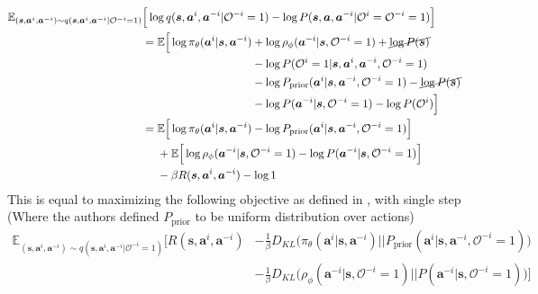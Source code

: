 \begin{equation}
    \begin{aligned}
        \mathbb{E}_{(\boldsymbol{s}, \boldsymbol{a}^i, \boldsymbol{a}^{-i}) \sim q(\boldsymbol{s}, \boldsymbol{a}^i, \boldsymbol{a}^{-i} | \mathcal{O}^{-i} = 1)} &\Big[\log q(\boldsymbol{s}, \boldsymbol{a}^i, \boldsymbol{a}^{-i} | \mathcal{O}^{-i} = 1) - \log P(\boldsymbol{s}, \boldsymbol{a}, \boldsymbol{a}^{-i} | \mathcal{O}^{i} = \mathcal{O}^{-i} = 1) \Big] \\
        &= \begin{aligned}[t]
                \mathbb{E}\Big[ \log \pi_{\theta}(\boldsymbol{a}^i | \boldsymbol{s}, \boldsymbol{a}^{-i}) &+ \log \rho_{\phi}(\boldsymbol{a}^{-i} | \boldsymbol{s}, \mathcal{O}^{-i} = 1) + \cancel{\log P(\boldsymbol{s})} \\
                &-\log P(\mathcal{O}^i = 1 | \boldsymbol{s}, \boldsymbol{a}^i, \boldsymbol{a}^{-i}, \mathcal{O}^{-i} = 1) \\
                &- \log P_{\text{prior}}(\boldsymbol{a}^i | \boldsymbol{s}, \boldsymbol{a}^{-i}, \mathcal{O}^{-i} = 1) - \cancel{\log P(\boldsymbol{s})} \\
                &- \log P(\boldsymbol{a}^{-i} |\boldsymbol{s}, \mathcal{O}^{-i} = 1) - \log P(\mathcal{O}^{i}) \Big] 
            \end{aligned} \\
        &= \begin{aligned}[t]
                &\mathbb{E}\Big[ \log \pi_{\theta}(\boldsymbol{a}^i | \boldsymbol{s}, \boldsymbol{a}^{-i}) -  \log P_{\text{prior}}(\boldsymbol{a}^i | \boldsymbol{s}, \boldsymbol{a}^{-i}, \mathcal{O}^{-i} = 1) \Big] \\ 
                &+\mathbb{E}\Big[ \log \rho_{\phi}(\boldsymbol{a}^{-i} | \boldsymbol{s}, \mathcal{O}^{-i} = 1) - \log P(\boldsymbol{a}^{-i} |\boldsymbol{s}, \mathcal{O}^{-i} = 1) \Big] \\
                &-\beta R(\boldsymbol{s}, \boldsymbol{a}^i, \boldsymbol{a}^{-i}) -\log 1
            \end{aligned}
    \end{aligned} 
\end{equation}
This is equal to maximizing the following objective as defined in \cite{tian2019regularized}, with single step (Where the authors defined $P_{\text{prior}}$ to be uniform distribution over actions)
\begin{equation}
    \begin{aligned}
        \mathbb{E}_{(\boldsymbol{s}, \boldsymbol{a}^i, \boldsymbol{a}^{-i}) \sim q(\boldsymbol{s}, \boldsymbol{a}^i, \boldsymbol{a}^{-i} | \mathcal{O}^{-i} = 1)}\bigg[R(\boldsymbol{s}, \boldsymbol{a}^i, \boldsymbol{a}^{-i}) &- \frac{1}{\beta} D_{KL} \Big(\pi_{\theta}(\boldsymbol{a}^i | \boldsymbol{s}, \boldsymbol{a}^{-i}) \Big|\Big| P_{\text{prior}}(\boldsymbol{a}^i | \boldsymbol{s}, \boldsymbol{a}^{-i}, \mathcal{O}^{-i} = 1) \Big)  \\
        & - \frac{1}{\beta} D_{KL} \Big( \rho_{\phi}(\boldsymbol{a}^{-i} | \boldsymbol{s}, \mathcal{O}^{-i} = 1) \Big|\Big| P(\boldsymbol{a}^{-i} |\boldsymbol{s}, \mathcal{O}^{-i} = 1) \Big)\bigg]
    \end{aligned}
\end{equation}
